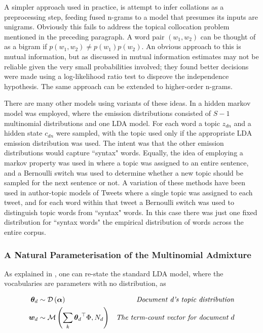 A simpler approach used in practice, is attempt to infer collations as a preprocessing step, feeding fused n-grams to a model that presumes its inputs are unigrams. Obviously this fails to address the topical collocation problem mentioned in the preceding paragraph. A word pair $\left(w_1, w_2\right)$ can be thought of as a bigram if $p(w_1, w_2) \neq p(w_1)p(w_2)$. An obvious approach to this is mutual information, but as discussed in \cite{Dunning1993} mutual information estimates may not be reliable given the very small probabilities involved; they found better decisions were made using a log-likelihood ratio test to disprove the independence hypothesis. The same approach can be extended to higher-order n-grams.

There are many other models using variants of these ideas. In \cite{Griffiths2005} a hidden markov model was employed, where the emission distributions consisted of $S-1$ multinomial distributions and one LDA model. For each word a topic $z_{dn}$ and a hidden state $c_{dn}$ were sampled, with the topic used only if the appropriate LDA emission distribution was used. The intent was that the other emission distributions would capture ``syntax" words. Equally, the idea of employing a markov property was used in \cite{Gruber2007} where a topic was assigned to an entire sentence, and a Bernoulli switch was used to determine whether a new topic should be sampled for the next sentence or not. A variation of these methods have been used in author-topic models of Tweets\cite{Zhao2011}\cite{Zhao2011a} where a single topic was assigned to each tweet, and for each word within that tweet a Bernoulli switch was used to distinguish topic words from ``syntax" words. In this case there was just one fixed distribution for ``syntax words" the empirical distribution of words across the entire corpus.


\subsubsection*{A Natural Parameterisation of the Multinomial Admixture}
As explained in \cite{Buntine2002}, one can re-state the standard LDA model, where the vocabularies are parameters with no distribution, as

\begin{align}
{  \bm \theta _d } & \sim \mathcal{D} \left( {\bm \alpha} \right) & \text{\emph{Document d's topic distribution}} \\
\bm w_d & \sim \mathcal{M} \left( {\sum_k { \bm \theta_d }^\top\Phi},{N_d} \right) & \text{\emph{The term-count vector for document $d$}} \label{eqn:lda_convex_combo}
\end{align}

